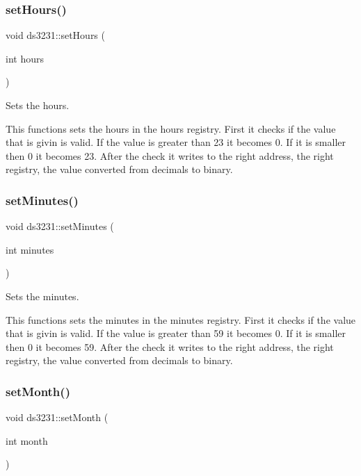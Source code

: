 \subsubsection{\texorpdfstring{set\+Hours()}{setHours()}}
{\footnotesize\ttfamily void ds3231\+::set\+Hours (\begin{DoxyParamCaption}\item[{int}]{hours }\end{DoxyParamCaption})\hspace{0.3cm}{\ttfamily [inline]}}



Sets the hours. 

This functions sets the hours in the hours registry. First it checks if the value that is givin is valid. If the value is greater than 23 it becomes 0. If it is smaller then 0 it becomes 23. After the check it writes to the right address, the right registry, the value converted from decimals to binary. \mbox{\label{classds3231_a2fa4365f601b3048b28f51785aa0941e}} 
\subsubsection{\texorpdfstring{set\+Minutes()}{setMinutes()}}
{\footnotesize\ttfamily void ds3231\+::set\+Minutes (\begin{DoxyParamCaption}\item[{int}]{minutes }\end{DoxyParamCaption})\hspace{0.3cm}{\ttfamily [inline]}}



Sets the minutes. 

This functions sets the minutes in the minutes registry. First it checks if the value that is givin is valid. If the value is greater than 59 it becomes 0. If it is smaller then 0 it becomes 59. After the check it writes to the right address, the right registry, the value converted from decimals to binary. \mbox{\label{classds3231_a535002d35845c9435010a78f5f5eed5e}} 
\subsubsection{\texorpdfstring{set\+Month()}{setMonth()}}
{\footnotesize\ttfamily void ds3231\+::set\+Month (\begin{DoxyParamCaption}\item[{int}]{month }\end{DoxyParamCaption})\hspace{0.3cm}{\ttfamily [inline]}}




